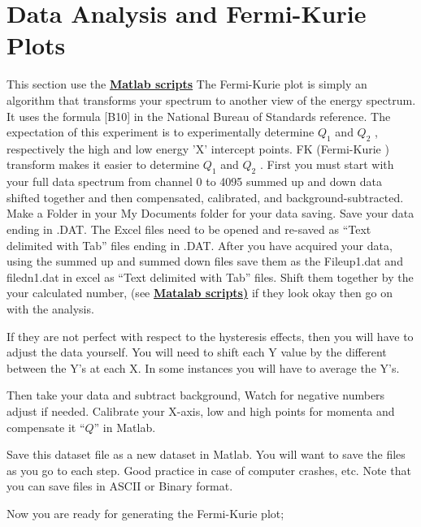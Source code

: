 \documentclass{../lab}
\begin{document}
\section{Data Analysis and Fermi-Kurie Plots}

This section use the \href{http://experimentationlab.berkeley.edu/matlabfitting}{\textbf{Matlab scripts}} The Fermi-Kurie plot is simply an algorithm that transforms your spectrum to another view of the energy spectrum. It uses the formula [B10] in the National Bureau of Standards reference. The expectation of this experiment is to experimentally determine $Q_1$ and $Q_2$ , respectively the high and low energy 'X' intercept points. FK (Fermi-Kurie ) transform makes it easier to determine $Q_1$ and $Q_2$ . First you must start with your full data spectrum from channel 0 to 4095 summed up and down data shifted together and then compensated, calibrated, and background-subtracted. Make a Folder in your My Documents folder for your data saving. Save your data ending in \*.DAT. The Excel files need to be opened and re-saved as ``Text delimited with Tab'' files ending in \*.DAT. After you have acquired your data, using the summed up and summed down files save them as the Fileup1.dat and filedn1.dat in excel as ``Text delimited with Tab'' files. Shift them together by the your calculated number, (see \href{http://experimentationlab.berkeley.edu/matlabfitting}{\textbf{Matalab scripts)}} if they look okay then go on with the analysis.

If they are not perfect with respect to the hysteresis effects, then you will have to adjust the data yourself. You will need to shift each Y value by the different between the Y's at each X. In some instances you will have to average the Y's.

Then take your data and subtract background, Watch for negative numbers adjust if needed. Calibrate your X-axis, low and high points for momenta and compensate it ``$Q$'' in Matlab.

Save this dataset file as a new dataset in Matlab. You will want to save the files as you go to each step. Good practice in case of computer crashes, etc. Note that you can save files in ASCII or Binary format.

Now you are ready for generating the Fermi-Kurie plot;
\end{document}
